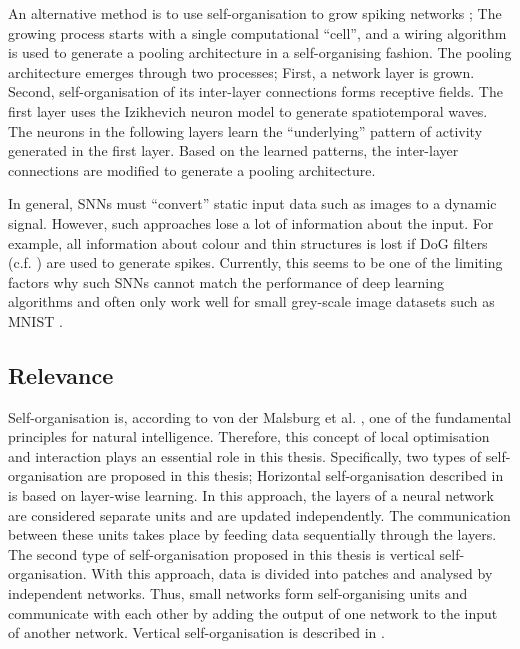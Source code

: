 An alternative method is to use self-organisation to grow spiking networks ; The growing process starts with a single computational ``cell'', and a wiring algorithm is used to generate a pooling architecture in a self-organising fashion.
The pooling architecture emerges through two processes; First, a network layer is grown. Second, self-organisation of its inter-layer connections forms receptive fields.
The first layer uses the Izikhevich neuron model  to generate spatiotemporal waves.
The neurons in the following layers learn the ``underlying'' pattern of activity generated in the first layer. 
Based on the learned patterns, the inter-layer connections are modified to generate a pooling architecture.

In general, SNNs must ``convert'' static input data such as images to a dynamic signal. However, such approaches lose a lot of information about the input.
For example, all information about colour and thin structures is lost if DoG filters (c.f. ) are used to generate spikes.
Currently, this seems to be one of the limiting factors why such SNNs cannot match the performance of deep learning algorithms and often only work well for small grey-scale image datasets such as MNIST \cite{Lecun_Bottou_Bengio_Haffner_1998}.



\subsection{Relevance}
Self-organisation is, according to von der Malsburg et al. , one of the fundamental principles for natural intelligence.
Therefore, this concept of local optimisation and interaction plays an essential role in this thesis.
Specifically, two types of self-organisation are proposed in this thesis;
Horizontal self-organisation described in  is based on layer-wise learning. In this approach, the layers of a neural network are considered separate units and are updated independently.
The communication between these units takes place by feeding data sequentially through the layers.
The second type of self-organisation proposed in this thesis is vertical self-organisation. With this approach, data is divided into patches and analysed by independent networks. Thus, small networks form self-organising units and communicate with each other by adding the output of one network to the input of another network.
Vertical self-organisation is described in .



